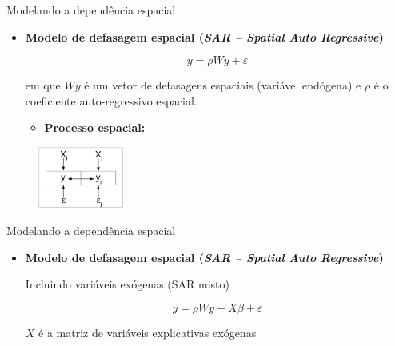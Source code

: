 \documentclass[aspectratio=169]{beamer}
\begin{document}
\begin{frame}{Modelando a dependência espacial}
    \begin{itemize}
        \item \textbf{Modelo de defasagem espacial (\textit{SAR -- Spatial Auto Regressive})}
        \vspace{0.5cm}
        \begin{block}{}
            $$y = \rho Wy + \varepsilon $$
        \end{block}
        \noindent em que $Wy$ é um vetor de defasagens espaciais (variável endógena)  e $\rho$ é o coeficiente auto-regressivo espacial. 
        \begin{itemize}
            \item \textbf{Processo espacial:}
        \end{itemize}
    \end{itemize}
    \begin{figure}
		\centering
		\includegraphics[width=0.25\textwidth]{img/reg_sar.png}
	\end{figure}
\end{frame}

\begin{frame}{Modelando a dependência espacial}
    \begin{itemize}
        \item \textbf{Modelo de defasagem espacial (\textit{SAR -- Spatial Auto Regressive})}
        
        \vspace{0.5cm}
        Incluindo variáveis exógenas (SAR misto)
        \vspace{0.2cm}
        \begin{block}{}
            $$y = \rho Wy + X\beta + \varepsilon $$
        \end{block}
        \noindent $X$ é a matriz de variáveis explicativas exógenas
    \end{itemize}
\end{frame}
\end{document}
